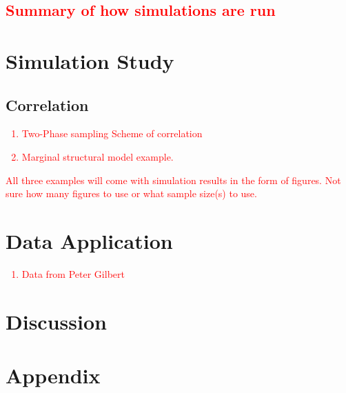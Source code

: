 \documentclass{article}
\newcommand{\sh}{\textcolor{red}}
\begin{document}
\sh{\subsection{Summary of how simulations are run}}

\section{Simulation Study}
\label{sec:sim_stdy}
\subsection{Correlation}

\sh{
\begin{enumerate}
	\item Two-Phase sampling Scheme of correlation
	\item Marginal structural model example.
\end{enumerate}
All three examples will come with simulation results in the form of figures.  Not sure how many figures to use or what sample size(s) to use.
}

\section{Data Application}

\sh{\begin{enumerate}
	\item Data from Peter Gilbert
\end{enumerate}
}

\section{Discussion}

\section{Appendix}
\end{document}
